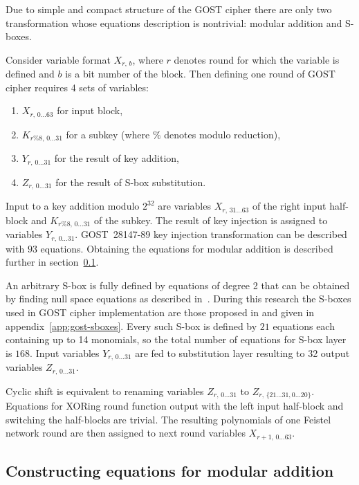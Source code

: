 Due to simple and compact structure of the GOST cipher there are only two
transformation whose equations description is nontrivial: modular addition and
S-boxes.

Consider variable format $X_{r, \, b}$, where $r$ denotes round for which the
variable is defined and $b$ is a bit number of the block. Then defining one
round of GOST cipher requires 4 sets of variables: 
\begin{enumerate}
    \item $X_{r, \, 0 \hdots 63}$ for input block, 
    \item $K_{r \% 8, \, 0 \hdots 31}$ for a subkey (where $\%$
        denotes modulo reduction), 
    \item $Y_{r, \, 0 \hdots 31}$ for the result of key addition, 
    \item $Z_{r, \, 0 \hdots 31}$ for the result of S-box substitution. 
\end{enumerate}

Input to a key addition modulo $2^{32}$ are variables 
$X_{r, \, 31 \hdots 63}$ of the right input half-block and 
$K_{r \% 8, \, 0 \hdots 31}$ of the subkey. The result of key injection is
assigned to variables $Y_{r, \, 0 \hdots 31}$. GOST~28147-89 key injection
transformation can be described with $93$ equations. Obtaining the equations
for modular addition is described further in section~\ref{seq:key-add-eqn}.

An arbitrary S-box is fully defined by equations of degree 2 that can be
obtained by finding null space equations as described in~\cite{kleiman:xsl}.
During this research the S-boxes used in GOST cipher implementation are those
proposed in \cite{GOST3411} and given in appendix~\ref{app:gost-sboxes}. Every
such S-box is defined by $21$ equations each containing up to 14 monomials, so
the total number of equations for S-box layer is $168$.  Input variables $Y_{r,
\, 0 \hdots 31}$ are fed to substitution layer resulting to 32 output variables
$Z_{r, \, 0 \hdots 31}$.

Cyclic shift is equivalent to renaming variables $Z_{r, \, 0 \hdots 31}$ to 
$Z_{r, \, \{21 \hdots 31, 0 \hdots 20\}}$. Equations for XORing round function
output with the left input half-block and switching the half-blocks are
trivial. The resulting polynomials of one Feistel network round are then
assigned to next round variables $X_{r+1, \, 0 \hdots 63}$.

\subsection{Constructing equations for modular addition}
\label{seq:key-add-eqn}

